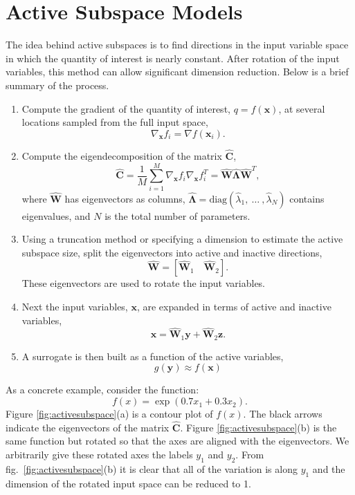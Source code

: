 \chapter{Active Subspace Models}\label{Chap:ActSub}
The idea behind active subspaces is to find directions in the input variable
space in which the quantity of interest is nearly constant. After rotation of
the input variables, this method can allow significant dimension reduction. Below is a brief summary of the process.
\begin{enumerate}
\item Compute the gradient of the quantity of interest, $q = f(\mathbf{x})$,
    at several locations sampled from the full input space,
    $$\nabla_{\mathbf{x}} f_i = \nabla f(\mathbf{x}_i).$$

\item Compute the eigendecomposition of the matrix $\hat{\mathbf{C}}$,
    $$\hat{\mathbf{C}} = \frac{1}{M}\sum_{i=1}^{M}\nabla_{\mathbf{x}} f_i\nabla_{\mathbf{x}} f_i^T = \hat{\mathbf{W}}\hat{\mathbf{\Lambda}}\hat{\mathbf{W}}^T,$$
    where $\hat{\mathbf{W}}$ has eigenvectors as columns, 
    $\hat{\mathbf{\Lambda}} = \text{diag}(\hat{\lambda}_1,\:\ldots\:,\hat{\lambda}_N)$
    contains eigenvalues, and $N$ is the total number of parameters.

\item Using a truncation method or specifying a
    dimension to estimate the active subspace size, 
    split the eigenvectors into active and inactive directions,
    $$\hat{\mathbf{W}} = \left[\hat{\mathbf{W}}_1\quad\hat{\mathbf{W}}_2\right].$$
    These eigenvectors are used to rotate the input variables.

\item Next the input variables, $\mathbf{x}$, are expanded in terms of active and
    inactive variables,
    $$\mathbf{x} = \hat{\mathbf{W}}_1\mathbf{y} + \hat{\mathbf{W}}_2\mathbf{z}.$$

\item A surrogate is then built as a function of the active variables,
    $$g(\mathbf{y}) \approx f(\mathbf{x})$$
\end{enumerate}

As a concrete example, consider the function:~\cite{constantine2015active}
$$f(x) = \exp\left(0.7x_1 + 0.3x_2\right).$$
Figure \ref{fig:activesubspace}(a) is a contour plot of $f(x)$. The black arrows indicate the
eigenvectors of the matrix $\hat{\mathbf{C}}$. Figure \ref{fig:activesubspace}(b) is the same 
function but rotated so that the axes are aligned with the eigenvectors. We arbitrarily
give these rotated axes the labels $y_1$ and $y_2$. From fig.~\ref{fig:activesubspace}(b) it is
clear that all of the variation is along $y_1$ and the dimension of the rotated
input space can be reduced to 1.

